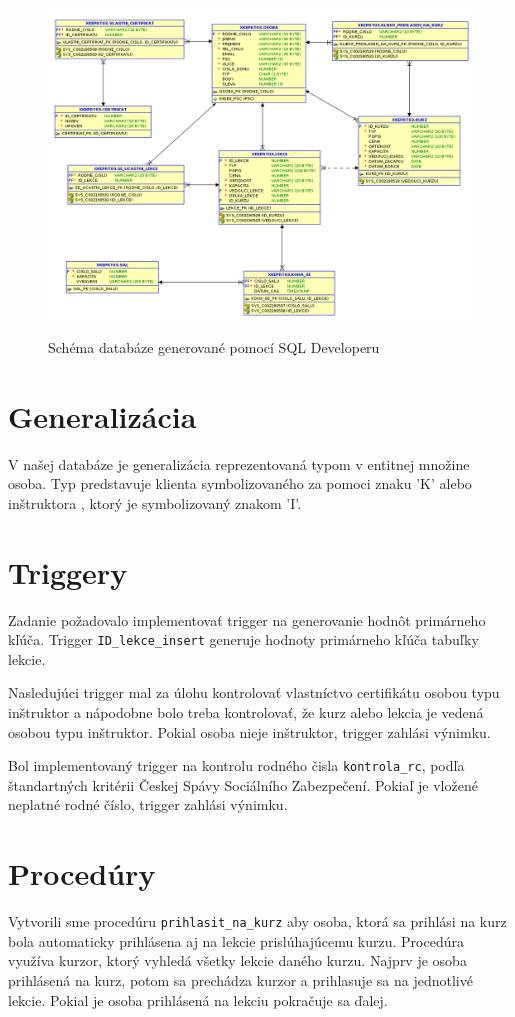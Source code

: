 \documentclass[11pt]{article}
\begin{document}
\begin{figure}[ht]
    \caption{Schéma databáze generované pomocí SQL Developeru}    
    \includegraphics[scale=.538]{schema_DB.png}    
    \label{lopata}
\end{figure}
\restoregeometry

\section{Generalizácia}
V našej databáze je generalizácia reprezentovaná typom v entitnej množine osoba.
Typ predstavuje klienta symbolizovaného za pomoci znaku 'K' alebo inštruktora , ktorý je symbolizovaný
znakom 'I'. 

\section{Triggery}
Zadanie požadovalo implementovať trigger na generovanie hodnôt primárneho kľúča.
Trigger \texttt{ID\_lekce\_insert} generuje hodnoty primárneho kľúča tabuľky lekcie.

Nasledujúci trigger mal za úlohu kontrolovať vlastníctvo certifikátu osobou typu inštruktor a nápodobne bolo
treba kontrolovať, že kurz alebo lekcia je vedená osobou typu inštruktor. Pokial osoba
nieje inštruktor, trigger zahlási výnimku. 

Bol implementovaný trigger na kontrolu rodného čisla \texttt{kontrola\_rc}, podľa štandartných kritérii Českej Spávy Sociálního 
Zabezpečení. Pokiaľ je vložené neplatné rodné číslo, trigger zahlási výnimku. 

\section{Procedúry}
Vytvorili sme procedúru \texttt{prihlasit\_na\_kurz} aby osoba, ktorá sa prihlási na kurz bola automaticky
prihlásena aj na lekcie prislúhajúcemu kurzu. Procedúra využíva kurzor, ktorý vyhledá všetky lekcie daného kurzu.
Najprv je osoba prihlásená na kurz, potom sa prechádza kurzor a prihlasuje sa na jednotlivé lekcie. Pokial je osoba
prihlásená na lekciu pokračuje sa ďalej.
\end{document}
